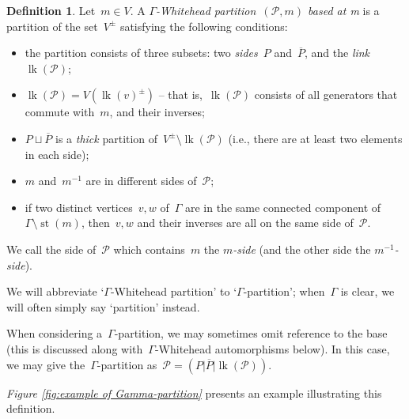 \documentclass[11pt]{amsart}
\theoremstyle{definition}
\theoremstyle{definition}
\theoremstyle{definition}
\theoremstyle{definition}
\newtheorem{definition}[theorem]{Definition}
\newcommand{\calP}{\mathcal{P}} %
\newcommand{\link}[1]{\operatorname{lk}({#1})} %
\newcommand{\str}[1]{\operatorname{st}({#1})} %
\begin{document}
\begin{definition}\label{def:Gamma-Whitehead partition}
    Let~$m \in V$. A \emph{$\Gamma$-Whitehead partition~$(\mathcal{P}, m)$ based at m} is a partition of the set~$V^\pm$ satisfying the following conditions:
    \begin{itemize}
        \item the partition consists of three subsets: two \emph{sides}~$P$ and~$\overline{P}$, and the \emph{link}~$\link{\calP}$;
        \item \noindent$\link{\calP} = V\left(\link{v}^\pm\right)$ -- that is,~$\link{\calP}$ consists of all generators that commute with~$m$, and their inverses;
        \item \noindent$P \sqcup \overline{P}$ is a \emph{thick} partition of~$V^\pm \setminus \link{\calP}$ (i.e., there are at least two elements in each side);
        \item \noindent$m$ and~$m^{-1}$ are in different sides of~$\calP$;
        \item if two distinct vertices~$v, w$ of~$\Gamma$ are in the same connected component of~$\Gamma \setminus \str{m}$, then~$v, w$ and their inverses are all on the same side of~$\calP$.
    \end{itemize}

    We call the side of~$\calP$ which contains~$m$ the \emph{$m$-side} (and the other side the \emph{$m^{-1}$-side}). 

    \noindent We will abbreviate `$\Gamma$-Whitehead partition' to `$\Gamma$-partition'; when~$\Gamma$ is clear, we will often simply say `partition' instead.
\end{definition}

When considering a~$\Gamma$-partition, we may sometimes omit reference to the base (this is discussed along with~$\Gamma$-Whitehead automorphisms below). In this case, we may give the~$\Gamma$-partition as~$\calP = \left(P\vert \overline{P} \vert \link{\calP}\right)$.

\emph{Figure \ref{fig:example of Gamma-partition}} presents an example illustrating this definition.
\end{document}
